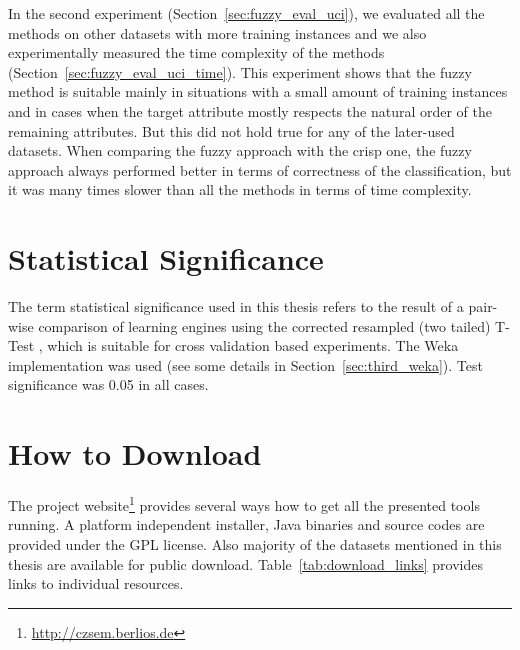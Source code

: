 In the second experiment (Section~\ref{sec:fuzzy_eval_uci}), we evaluated all the methods on other datasets with more training instances and we also experimentally measured the time complexity of the methods (Section~\ref{sec:fuzzy_eval_uci_time}). This experiment shows that the fuzzy method is suitable mainly in situations with a small amount of training instances and in cases when the target attribute mostly respects the natural order of the remaining attributes. But this did not hold true for any of the later-used datasets. When comparing the fuzzy approach with the crisp one, the fuzzy approach always performed better in terms of correctness of the classification, but it was many times slower than all the methods in terms of time complexity.



\section{Statistical Significance} \label{sec:conclusion_statsig}
The term statistical significance used in this thesis refers to the result of a pair-wise comparison of learning engines using the corrected resampled (two tailed) T-Test \citep{Nadeau:2003:IGE:779909.779927}, which is suitable for cross validation based experiments. The Weka implementation was used (see some details in Section~\ref{sec:third_weka}). Test significance was 0.05 in all cases.




\section{How to Download} \label{sec:download_notes}
The project website\footnote{\url{http://czsem.berlios.de}} provides several ways how to get all the presented tools running. A platform independent installer, Java binaries and source codes are provided under the GPL license.
%
Also majority of the datasets mentioned in this thesis are available for public download.
%
Table~\ref{tab:download_links} provides links to individual resources.


